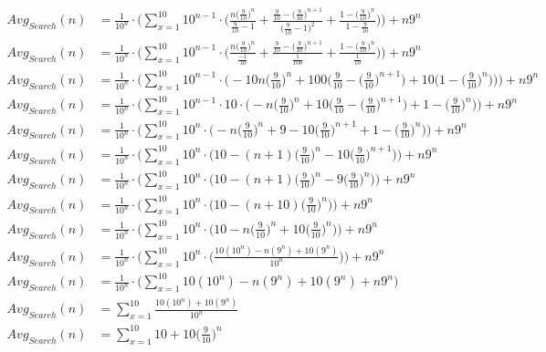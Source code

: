 \documentclass{article}
\begin{document}
\begin{enumerate}
	\begin{align*}
	Avg_{Search}(n) &= \frac{1}{10^n} \cdot \Bigg( \sum_{x=1}^{10}  10^{n-1} \cdot \bigg( \frac{n\Big( \frac{9}{10}\Big)^n}{\frac{9}{10} - 1} + \frac{\frac{9}{10} - \Big( \frac{9}{10}\Big)^{n+1}}{\Big( \frac{9}{10} - 1\Big)^2} +  \frac{1 -  \Big( \frac{9}{10}\Big)^{n}}{1 - \frac{9}{10}} \bigg) \Bigg)  + n9^n\\
	Avg_{Search}(n) &= \frac{1}{10^n} \cdot \Bigg( \sum_{x=1}^{10}  10^{n-1} \cdot \bigg( \frac{n\Big( \frac{9}{10}\Big)^n}{\frac{-1}{10}} + \frac{\frac{9}{10} - \Big( \frac{9}{10}\Big)^{n+1}}{\frac{1}{100}} +  \frac{1 -  \Big( \frac{9}{10}\Big)^{n}}{\frac{1}{10}} \bigg) \Bigg) + n9^n\\
	Avg_{Search}(n) &= \frac{1}{10^n} \cdot \Bigg( \sum_{x=1}^{10}  10^{n-1} \cdot \bigg( -10n\Big( \frac{9}{10}\Big)^n + 100\bigg( \frac{9}{10} - \Big( \frac{9}{10}\Big)^{n+1} \bigg) +  10\bigg( 1 - \Big( \frac{9}{10}\Big)^{n} \bigg) \bigg) \Bigg)  + n9^n\\
	Avg_{Search}(n) &= \frac{1}{10^n} \cdot \Bigg( \sum_{x=1}^{10}  10^{n-1} \cdot 10 \cdot \bigg( -n\Big( \frac{9}{10}\Big)^n + 10\bigg( \frac{9}{10} - \Big( \frac{9}{10}\Big)^{n+1} \bigg) + 1 - \Big( \frac{9}{10}\Big)^{n}\bigg) \Bigg) + n9^n\\
	Avg_{Search}(n) &= \frac{1}{10^n} \cdot \Bigg( \sum_{x=1}^{10}  10^n \cdot \bigg( -n\Big( \frac{9}{10}\Big)^n + 9 - 10\Big( \frac{9}{10}\Big)^{n+1} + 1 - \Big( \frac{9}{10}\Big)^{n} \bigg) \Bigg)  + n9^n\\
	Avg_{Search}(n) &= \frac{1}{10^n} \cdot \Bigg( \sum_{x=1}^{10}  10^n \cdot \bigg(10 -(n + 1)\Big( \frac{9}{10}\Big)^n - 10\Big( \frac{9}{10}\Big)^{n+1} \bigg) \Bigg)  + n9^n\\
	Avg_{Search}(n) &= \frac{1}{10^n} \cdot \Bigg( \sum_{x=1}^{10}  10^n \cdot \bigg(10 -(n + 1)\Big( \frac{9}{10}\Big)^n - 9\Big( \frac{9}{10}\Big)^n \bigg) \Bigg)  + n9^n\\
	Avg_{Search}(n) &= \frac{1}{10^n} \cdot \Bigg( \sum_{x=1}^{10}  10^n \cdot \bigg(10 -(n + 10)\Big( \frac{9}{10}\Big)^n  \bigg) \Bigg)  + n9^n\\
	Avg_{Search}(n) &= \frac{1}{10^n} \cdot \Bigg( \sum_{x=1}^{10}  10^n \cdot \bigg(10 -n\Big( \frac{9}{10}\Big)^n + 10\Big( \frac{9}{10}\Big)^n  \bigg) \Bigg)  + n9^n\\
	Avg_{Search}(n) &= \frac{1}{10^n} \cdot \Bigg( \sum_{x=1}^{10}  10^n \cdot \bigg(\frac{10(10^n) - n(9^n) + 10(9^n)}{10^n}  \bigg) \Bigg)+ n9^n\\
	Avg_{Search}(n) &= \frac{1}{10^n} \cdot \Bigg( \sum_{x=1}^{10}  10(10^n) - n(9^n) + 10(9^n) + n9^n \Bigg) \\
	Avg_{Search}(n) &= \sum_{x=1}^{10}  \frac{10(10^n) + 10(9^n)}{10^n}\\
	Avg_{Search}(n) &= \sum_{x=1}^{10}  10 + 10 \Big( \frac{9}{10}\Big)^n\\
	\end{align*}
	

\end{enumerate}
\end{document}
